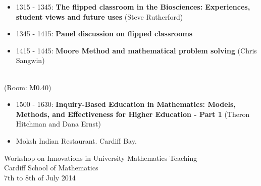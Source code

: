 \documentclass{article}
\begin{document}
\begin{itemize}
    \item 1315 - 1345: \textbf{The flipped classroom in the Biosciences: Experiences, student views and future uses} (Steve Rutherford)
    \item 1345 - 1415: \textbf{Panel discussion on flipped classrooms}
    \item 1415 - 1445: \textbf{Moore Method and mathematical problem solving} (Chris Sangwin)
\end{itemize}

\vspace{1cm}

\begin{center}
    \\
    \tiny{(Room: M0.40)}
\end{center}

\begin{itemize}
    \item 1500 - 1630: \textbf{Inquiry-Based Education in Mathematics: Models, Methods, and Effectiveness for Higher Education - Part 1} (Theron Hitchman and Dana Ernst)
\end{itemize}

\vspace{1cm}

\begin{center}
\end{center}

\begin{itemize}
    \item Moksh Indian Restaurant. Cardiff Bay.
\end{itemize}



\newpage

\begin{center}
    {\Huge Workshop on Innovations in University Mathematics Teaching}\\
    {\tiny Cardiff School of Mathematics}\\
    {\tiny 7th to 8th of July 2014}\\
    \vspace{1cm}
    {}\\
\end{center}

\vspace{1cm}
\end{document}

